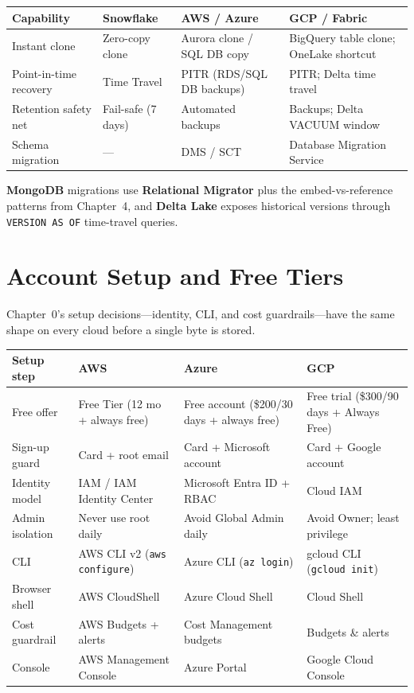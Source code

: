 \begin{center}
\footnotesize
\begin{tabular}{@{}p{2.8cm}p{3.0cm}p{3.0cm}p{3.4cm}@{}}
\toprule
\textbf{Capability} & \textbf{Snowflake} & \textbf{AWS / Azure} & \textbf{GCP / Fabric} \\
\midrule
Instant clone & Zero-copy clone & Aurora clone / SQL DB copy & BigQuery table clone; OneLake shortcut \\
Point-in-time recovery & Time Travel & PITR (RDS/SQL DB backups) & PITR; Delta time travel \\
Retention safety net & Fail-safe (7 days) & Automated backups & Backups; Delta VACUUM window \\
Schema migration & --- & DMS / SCT & Database Migration Service \\
\bottomrule
\end{tabular}
\end{center}

\noindent \textbf{MongoDB} migrations use \textbf{Relational Migrator} plus the embed-vs-reference
patterns from Chapter~4, and \textbf{Delta Lake} exposes historical versions through
\texttt{VERSION AS OF} time-travel queries.

\section{Account Setup and Free Tiers}
%
Chapter~0's setup decisions---identity, CLI, and cost guardrails---have the same shape on every
cloud before a single byte is stored.

\begin{center}
\footnotesize
\begin{tabular}{@{}p{2.9cm}p{3.0cm}p{3.0cm}p{3.0cm}@{}}
\toprule
\textbf{Setup step} & \textbf{AWS} & \textbf{Azure} & \textbf{GCP} \\
\midrule
Free offer & Free Tier (12 mo + always free) & Free account (\$200/30 days + always free) & Free trial (\$300/90 days + Always Free) \\
Sign-up guard & Card + root email & Card + Microsoft account & Card + Google account \\
Identity model & IAM / IAM Identity Center & Microsoft Entra ID + RBAC & Cloud IAM \\
Admin isolation & Never use root daily & Avoid Global Admin daily & Avoid Owner; least privilege \\
CLI & AWS CLI v2 (\texttt{aws configure}) & Azure CLI (\texttt{az login}) & gcloud CLI (\texttt{gcloud init}) \\
Browser shell & AWS CloudShell & Azure Cloud Shell & Cloud Shell \\
Cost guardrail & AWS Budgets + alerts & Cost Management budgets & Budgets \& alerts \\
Console & AWS Management Console & Azure Portal & Google Cloud Console \\
\bottomrule
\end{tabular}
\end{center}

